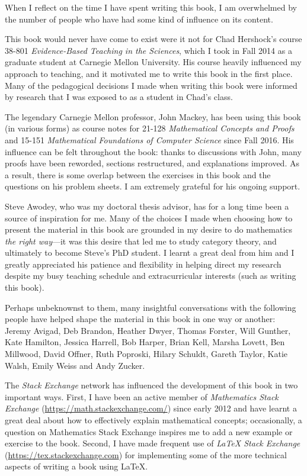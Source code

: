 When I reflect on the time I have spent writing this book, I am overwhelmed by the number of people who have had some kind of influence on its content.

This book would never have come to exist were it not for Chad Hershock's course 38-801 \textit{Evidence-Based Teaching in the Sciences}, which I took in Fall 2014 as a graduate student at Carnegie Mellon University. His course heavily influenced my approach to teaching, and it motivated me to write this book in the first place. Many of the pedagogical decisions I made when writing this book were informed by research that I was exposed to as a student in Chad's class.

The legendary Carnegie Mellon professor, John Mackey, has been using this book (in various forms) as course notes for 21-128 \textit{Mathematical Concepts and Proofs} and 15-151 \textit{Mathematical Foundations of Computer Science} since Fall 2016. His influence can be felt throughout the book: thanks to discussions with John, many proofs have been reworded, sections restructured, and explanations improved. As a result, there is some overlap between the exercises in this book and the questions on his problem sheets. I am extremely grateful for his ongoing support.

Steve Awodey, who was my doctoral thesis advisor, has for a long time been a source of inspiration for me. Many of the choices I made when choosing how to present the material in this book are grounded in my desire to do mathematics \textit{the right way}---it was this desire that led me to study category theory, and ultimately to become Steve's PhD student. I learnt a great deal from him and I greatly appreciated his patience and flexibility in helping direct my research despite my busy teaching schedule and extracurricular interests (such as writing this book).

Perhaps unbeknownst to them, many insightful conversations with the following people have helped shape the material in this book in one way or another: Jeremy Avigad, Deb Brandon, Heather Dwyer, Thomas Forster, Will Gunther, Kate Hamilton, Jessica Harrell, Bob Harper, Brian Kell, Marsha Lovett, Ben Millwood, David Offner, Ruth Poproski, Hilary Schuldt, Gareth Taylor, Katie Walsh, Emily Weiss and Andy Zucker.

The \textit{Stack Exchange} network has influenced the development of this book in two important ways. First, I have been an active member of \textit{Mathematics Stack Exchange} (\url{https://math.stackexchange.com/}) since early 2012 and have learnt a great deal about how to effectively explain mathematical concepts; occasionally, a question on Mathematics Stack Exchange inspires me to add a new example or exercise to the book. Second, I have made frequent use of \textit{\LaTeX{} Stack Exchange} (\url{https://tex.stackexchange.com}) for implementing some of the more technical aspects of writing a book using \LaTeX{}.


